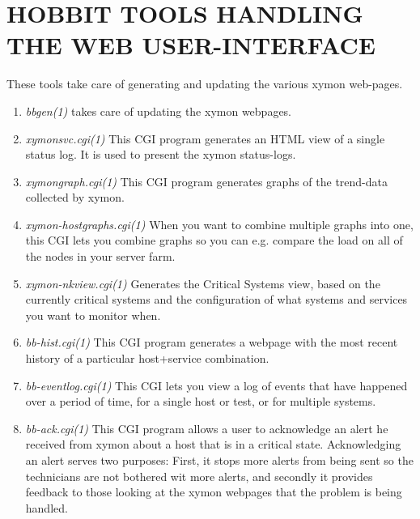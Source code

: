  
\section{HOBBIT TOOLS HANDLING THE WEB USER-INTERFACE}
 These tools take care of generating and updating the various xymon web-pages. 

\begin{enumerate}
 \item \emph{bbgen(1)}
 takes care of updating the xymon webpages. 


 \item \emph{xymonsvc.cgi(1)}
 This CGI program generates an HTML view of a single status log. It is used to present the xymon status-logs. 


 \item \emph{xymongraph.cgi(1)}
 This CGI program generates graphs of the trend-data collected by xymon. 


 \item \emph{xymon-hostgraphs.cgi(1)}
 When you want to combine multiple graphs into one, this CGI lets you
 combine graphs so you can e.g. compare the load on all of the nodes
 in your server farm. 



 \item \emph{xymon-nkview.cgi(1)}
 Generates the Critical Systems view, based on the currently critical
 systems and the configuration of what systems and services you want
 to monitor when. 



 \item \emph{bb-hist.cgi(1)}
 This CGI program generates a webpage with the most recent history of
 a particular host+service combination. 



 \item \emph{bb-eventlog.cgi(1)}
 This CGI lets you view a log of events that have happened over a
 period of time, for a single host or test, or for multiple systems. 



 \item \emph{bb-ack.cgi(1)}
 This CGI program allows a user to acknowledge an alert he received
 from xymon about a host that is in a critical state. Acknowledging
 an alert serves two purposes: First, it stops more alerts from being
 sent so the technicians are not bothered wit more alerts, and
 secondly it provides feedback to those looking at the xymon webpages
 that the problem is being handled. 




\end{enumerate}
